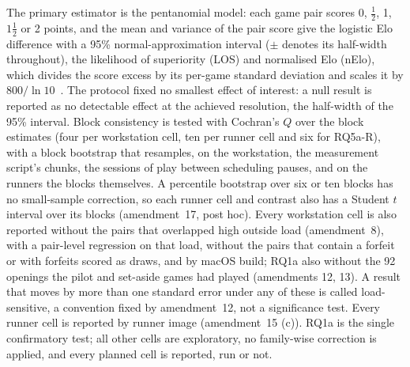 \documentclass{article}
\begin{document}
The primary estimator is the pentanomial model: each game pair scores 0, $\tfrac12$, 1, $1\tfrac12$ or 2 points, and the mean and variance of the pair score give the logistic Elo difference with a 95\% normal-approximation interval ($\pm$ denotes its half-width throughout), the likelihood of superiority (LOS) and normalised Elo (nElo), which divides the score excess by its per-game standard deviation and scales it by $800/\ln 10$~\cite{vdbergh_nelo,fishtest}. The protocol fixed no smallest effect of interest: a null result is reported as no detectable effect at the achieved resolution, the half-width of the 95\% interval. Block consistency is tested with Cochran's $Q$ over the block estimates (four per workstation cell, ten per runner cell and six for RQ5a-R), with a block bootstrap that resamples, on the workstation, the measurement script's chunks, the sessions of play between scheduling pauses, and on the runners the blocks themselves. A percentile bootstrap over six or ten blocks has no small-sample correction, so each runner cell and contrast also has a Student $t$ interval over its blocks (amendment~17, post hoc). Every workstation cell is also reported without the pairs that overlapped high outside load (amendment~8), with a pair-level regression on that load, without the pairs that contain a forfeit or with forfeits scored as draws, and by macOS build; RQ1a also without the 92 openings the pilot and set-aside games had played (amendments 12, 13). A result that moves by more than one standard error under any of these is called load-sensitive, a convention fixed by amendment~12, not a significance test. Every runner cell is reported by runner image (amendment~15 (c)). RQ1a is the single confirmatory test; all other cells are exploratory, no family-wise correction is applied, and every planned cell is reported, run or not.
\end{document}

